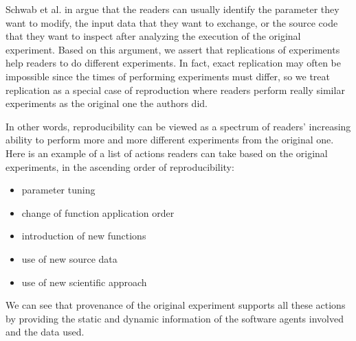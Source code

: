 Schwab et al. in \cite{schwab2000making} argue that the readers can usually identify the parameter 
they want to modify, the input data that they want to exchange, or the source code that they want to 
inspect after analyzing the execution of the original experiment. Based on this argument, we assert 
that replications of experiments help readers to do different experiments. In fact, exact replication 
may often be impossible since the times of performing experiments must differ, so we treat replication as a 
special case of reproduction where readers perform really similar experiments as the original one the 
authors did.

In other words, reproducibility can be viewed as a spectrum of readers' increasing ability to perform 
more and more different experiments from the original one. Here is an example of a list of actions 
readers can take based on the original experiments, in the ascending order of reproducibility:
\begin{itemize}
\item parameter tuning
\item change of function application order
\item introduction of new functions
\item use of new source data
\item use of new scientific approach
\end{itemize}
We can see that provenance of the original experiment supports all these actions by providing the 
static and dynamic information of the software agents involved and the data used.


